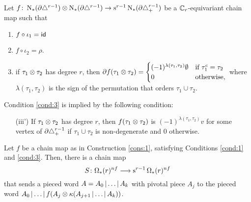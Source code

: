 \begin{construction}\label{cons:1} Let $f \colon \operatorname{N}_{*}(\partial\triangle^{r-1}) \otimes \operatorname{N}_{*}(\partial\triangle^{r-1}) \to \operatorname{s}^{r-1}\operatorname{N}_{*}(\partial\triangle_{+}^{r-1})$ be a $\mathbb{C}_r$-equivariant chain map such that
\renewcommand{\theenumi}{\roman{enumi}}
\begin{enumerate}
	\item\label{cond:1} $f\circ \iota_1 = \mathsf{id}$
	\item\label{cond:2} $f\circ \iota_2 = \rho$.
	\item\label{cond:3} if $\tau_1 \otimes \tau_2$ has degree $r$, then $ \partial f(\tau_1 \otimes \tau_2) =
	\begin{cases}
		(-1)^{\lambda(\tau_1,\tau_2)}\emptyset & \text{if $\tau_1^c=\tau_2$} \\
		0 & \text{otherwise},
	\end{cases}$
	where $\lambda(\tau_1,\tau_2)$ is the sign of the permutation that orders $\tau_1\cup \tau_2$.
\end{enumerate}
\end{construction}

\begin{remark}\label{remark:3prime}
	Condition \eqref{cond:3} is implied by the following condition:
	\begin{itemize}
		\item[(iii')] If $\tau_1 \otimes \tau_2$ has degree $r$, then $f(\tau_1 \otimes \tau_2)$ is $(-1)^{\lambda(\tau_1,\tau_2)} v$ for some vertex of $\partial \triangle_{+}^{r-1}$ if $\tau_1\cup\tau_2$ is non-degenerate and $0$ otherwise.
	\end{itemize}
\end{remark}

\begin{proposition} Let $f$ be a chain map as in Construction \ref{cons:1}, satisfying Conditions \eqref{cond:1} and \eqref{cond:3}. Then, there is a chain map
	\[
	S \colon \Omega_*(r)^{nf} \longrightarrow \operatorname{s}^{r-1}\Omega_*(r)^{nf}
	\]
	that sends a pieced word $A = A_0\operatorname{|} \dots\operatorname{|} A_k$ with pivotal piece $A_j$ to the pieced word $ A_0\operatorname{|} \dots\operatorname{|} f(A_j \otimes \kappa(A_{j+1}\operatorname{|} \dots\operatorname{|} A_k))$.
\end{proposition}

